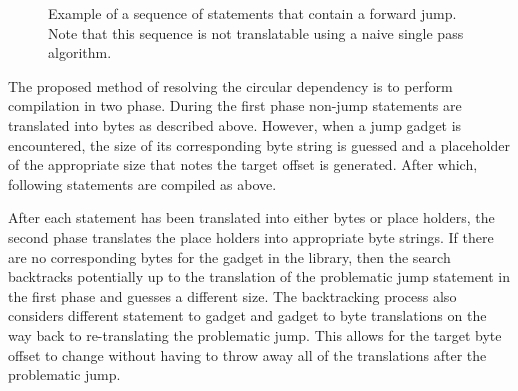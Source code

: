     \begin{figure}
        \centering
        \caption[Example of a sequence of statements that contain a forward
        jump.]{Example of a sequence of statements that contain a forward
        jump. Note that this sequence is not translatable using a naive single
        pass algorithm.}
        \label{fig:method-forward-jump}
    \end{figure}

    The proposed method of resolving the circular dependency is to perform
    compilation in two phase. During the first phase non-jump statements are
    translated into bytes as described above. However, when a jump gadget is
    encountered, the size of its corresponding byte string is guessed and a
    placeholder of the appropriate size that notes the target offset is
    generated. After which, following statements are compiled as above.

    After each statement has been translated into either bytes or place holders,
    the second phase translates the place holders into appropriate byte strings.
    If there are no corresponding bytes for the gadget in the library, then the
    search backtracks potentially up to the translation of the problematic jump
    statement in the first phase and guesses a different size. The backtracking
    process also considers different statement to gadget and gadget to byte
    translations on the way back to re-translating the problematic jump. This
    allows for the target byte offset to change without having to throw away all
    of the translations after the problematic jump.

